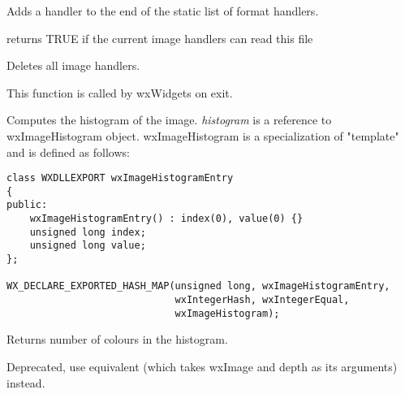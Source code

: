 Adds a handler to the end of the static list of format handlers.





returns TRUE if the current image handlers can read this file



Deletes all image handlers.

This function is called by wxWidgets on exit.

\label{wximagecomputehistogram}


Computes the histogram of the image. {\it histogram} is a reference to 
wxImageHistogram object. wxImageHistogram is a specialization of 
 "template" and is defined as follows:

\begin{verbatim}
class WXDLLEXPORT wxImageHistogramEntry
{
public:
    wxImageHistogramEntry() : index(0), value(0) {}
    unsigned long index;
    unsigned long value;
};

WX_DECLARE_EXPORTED_HASH_MAP(unsigned long, wxImageHistogramEntry,
                             wxIntegerHash, wxIntegerEqual,
                             wxImageHistogram);
\end{verbatim}


Returns number of colours in the histogram.

\label{wximageconverttobitmap}


Deprecated, use equivalent 
(which takes wxImage and depth as its arguments) instead.

\label{wxbitmapconverttomono}

